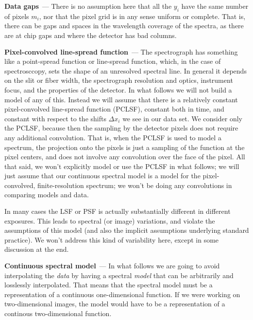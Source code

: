 \documentclass[modern]{aastex631}
\renewcommand{\paragraph}[1]{\medskip\par\noindent\textbf{#1}~---}
\begin{document}
\paragraph{Data gaps}
There is no assumption here that all the $y_i$ have the same number of pixels $m_i$, nor that the pixel grid is in any sense uniform or complete.
That is, there can be gaps and spaces in the wavelength coverage of the spectra, as there are at chip gaps and where the detector has bad columns.

\paragraph{Pixel-convolved line-spread function}
The spectrograph has something like a point-spread function or line-spread function, which, in the case of spectrosccopy, sets the shape of an unresolved spectral line.
In general it depends on the slit or fiber width, the spectrograph resolution and optics, instrument focus, and the properties of the detector.
In what follows we will not build a model of any of this.
Instead we will assume that there is a relatively constant pixel-convolved line-spread function (PCLSF), constant both in time, and constant with respect to the shifts $\Delta x_i$ we see in our data set.
We consider only the PCLSF, because then the sampling by the detector pixels does not require any additional convolution.
That is, when the PCLSF is used to model a spectrum, the projection onto the pixels is just a sampling of the function at the pixel centers, and does not involve any convolution over the face of the pixel.
All that said, we won't explicitly model or use the PCLSF in what follows; we will just assume that our continuous spectral model is a model for the pixel-convolved, finite-resolution spectrum; we won't be doing any convolutions in comparing models and data.

In many cases the LSF or PSF is actually substantially different in different exposures.
This leads to spectral (or image) variations, and violate the assumptions of this model (and also the implicit assumptions underlying standard practice).
We won't address this kind of variability here, except in some discussion at the end.

\paragraph{Continuous spectral model} 
In what follows we are going to avoid interpolating the \emph{data} by having a spectral \emph{model} that can be arbitrarily and losslessly interpolated.
That means that the spectral model must be a representation of a continuous one-dimensional function.
If we were working on two-dimensional images, the model would have to be a representation of a continous two-dimensional function.
\end{document}
